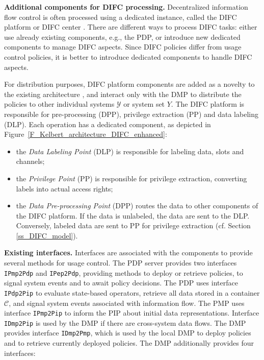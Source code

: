\textbf{Additional components for DIFC processing.} Decentralized information flow control is often processed using a dedicated instance, called the DIFC platform \cite{Schultz2013} or DIFC center \cite{Lu2022}. There are different ways to process DIFC tasks: either use already existing components, e.g., the PDP, or introduce new dedicated components to manage DIFC aspects. Since DIFC policies differ from usage control policies, it is better to introduce dedicated components to handle DIFC aspects.

For distribution purposes, DIFC platform components are added as a novelty to the existing architecture \cite{Lu2022}, and interact only with the DMP to distribute the policies to other individual systems $\mathcal{Y}$ or system set $Y$. The DIFC platform is responsible for pre-processing (DPP), privilege extraction (PP) and data labeling (DLP). Each operation has a dedicated component, as depicted in Figure~\ref{F_Kelbert_architecture_DIFC_enhanced}:
\begin{itemize}
    \item the \emph{Data Labeling Point} (DLP) is responsible for labeling data, slots and channels;
    \item the \emph{Privilege Point} (PP) is responsible for privilege extraction, converting labels into actual access rights;
    \item the \emph{Data Pre-processing Point} (DPP) routes the data to other components of the DIFC platform. If the data is unlabeled, the data are sent to the DLP. Conversely, labeled data are sent to PP for privilege extraction (cf. Section \ref{ss_DIFC_model}).
\end{itemize}


\textbf{Existing interfaces.}
Interfaces are associated with the components to provide several methods for usage control.
The PDP server provides two interfaces \texttt{IPmp2Pdp} and \texttt{IPep2Pdp}, providing methods to deploy or retrieve policies,  
to signal system events and to await policy decisions.
The PDP uses interface \texttt{IPdp2Pip} to evaluate state-based operators, retrieve all data stored in a  
container $\mathcal{C}$, and signal system events associated with information flow. The PMP uses interface \texttt{IPmp2Pip} to inform the PIP about initial data
representations. Interface \texttt{IDmp2Pip} is used by the DMP if there are cross-system data flows.
The DMP provides interface \texttt{IDmp2Pmp}, which is used by the local DMP to deploy policies and to retrieve currently
deployed policies. The DMP additionally provides four interfaces:

